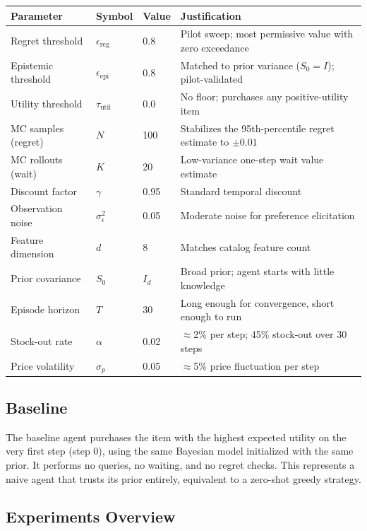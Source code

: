 \documentclass[11pt,letterpaper]{article}
\newcommand{\epsreg}{\epsilon_{\mathrm{reg}}}
\newcommand{\epsepi}{\epsilon_{\mathrm{epi}}}
\begin{document}
\begin{center}
\small
\begin{tabular}{@{}llll@{}}
\toprule
Parameter & Symbol & Value & Justification \\
\midrule
Regret threshold & $\epsreg$ & 0.8 & Pilot sweep; most permissive value with zero exceedance \\
Epistemic threshold & $\epsepi$ & 0.8 & Matched to prior variance ($S_0 = I$); pilot-validated \\
Utility threshold & $\tau_{\mathrm{util}}$ & 0.0 & No floor; purchases any positive-utility item \\
MC samples (regret) & $N$ & 100 & Stabilizes the 95th-percentile regret estimate to $\pm 0.01$ \\
MC rollouts (wait) & $K$ & 20 & Low-variance one-step wait value estimate \\
Discount factor & $\gamma$ & 0.95 & Standard temporal discount \\
Observation noise & $\sigma_\epsilon^2$ & 0.05 & Moderate noise for preference elicitation \\
Feature dimension & $d$ & 8 & Matches catalog feature count \\
Prior covariance & $S_0$ & $I_d$ & Broad prior; agent starts with little knowledge \\
Episode horizon & $T$ & 30 & Long enough for convergence, short enough to run \\
Stock-out rate & $\alpha$ & 0.02 & $\approx$2\% per step; 45\% stock-out over 30 steps \\
Price volatility & $\sigma_p$ & 0.05 & $\approx$5\% price fluctuation per step \\
\bottomrule
\end{tabular}
\end{center}

\subsection{Baseline}

The baseline agent purchases the item with the highest expected utility on the very first step (step 0), using the same Bayesian model initialized with the same prior.  It performs no queries, no waiting, and no regret checks.  This represents a naive agent that trusts its prior entirely, equivalent to a zero-shot greedy strategy.

\subsection{Experiments Overview}
\end{document}
